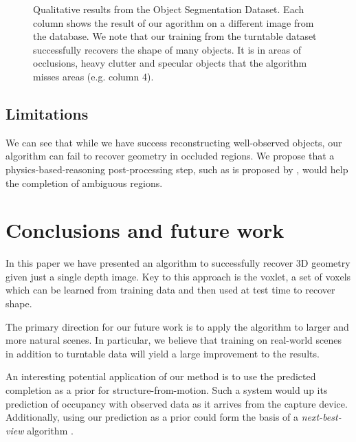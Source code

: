 \documentclass[10pt,twocolumn,letterpaper]{article}
\makeatletter
\renewcommand*{\eg}{e.g.\@\xspace}
\makeatother
\begin{document}
\begin{figure}
\begin{tabular}{cccc}
    \end{tabular}
     \caption{
     Qualitative results from the Object Segmentation Dataset. Each column shows the result of our agorithm on a different image from the database.
     We note that our training from the turntable dataset successfully recovers the shape of many objects.
     It is in areas of occlusions, heavy clutter and specular objects that the algorithm misses areas (\eg column 4).
     \label{fig:osd_qual}
     }
\end{figure}

\subsection{Limitations}
We can see that while we have success reconstructing well-observed objects, our algorithm can fail to recover geometry in occluded regions.
We propose that a physics-based-reasoning post-processing step, such as is proposed by \cite{zheng-cvpr-2013, shao-siggraphasia-2014}, would help the completion of ambiguous regions.


\section{Conclusions and future work}

In this paper we have presented an algorithm to successfully recover 3D geometry given just a single depth image.
Key to this approach is the voxlet, a set of voxels which can be learned from training data and then used at test time to recover shape.

The primary direction for our future work is to apply the algorithm to larger and more natural scenes.
In particular, we believe that training on real-world scenes in addition to turntable data will yield a large improvement to the results.

An interesting potential application of our method is to use the predicted completion as a prior for structure-from-motion.
Such a system would up its prediction of occupancy with observed data as it arrives from the capture device.
Additionally, using our prediction as a prior could form the basis of a \emph{next-best-view} algorithm \cite{Potthast2014148}.
\end{document}
